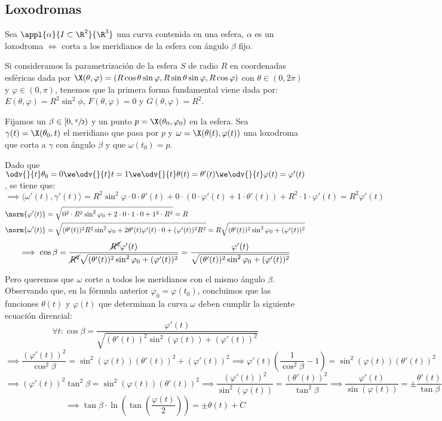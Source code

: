 \subsection{Loxodromas}

\begin{defn}[Loxodroma]
	Sea $\appl{\alpha}{I\subset\R^2}{\R^3}$ una curva contenida en una esfera, $\alpha$ es un loxodroma $\iff$ corta a los meridianos de la esfera con ángulo $\beta$ fijo.
\end{defn}

Si consideramos la parametrización de la esfera $S$ de radio $R$ en coordenadas esféricas dada por $\X(\theta, \varphi) = (R\cos\theta \sin\varphi, R\sin\theta \sin\varphi, R\cos\varphi)$ con $\theta \in (0, 2\pi)$ y $\varphi \in (0, \pi)$, tenemos que la primera forma fundamental viene dada por: $E(\theta, \varphi)=R^2\sin^2\phi$, $F(\theta, \varphi)=0$ y $G(\theta, \varphi)=R^2$.

Fijamos un $\beta \in [0, \sfrac{\pi}{2})$ y un punto $p = \X(\theta_0, \varphi_0)$ en la esfera. Sea $\gamma(t) = \X(\theta_0, t)$ el meridiano que pasa por $p$ y $\omega = \X(\theta(t), \varphi(t))$ una loxodroma que corta a $\gamma$ con ángulo $\beta$ y que $\omega(t_0) = p$.

Dado que $\odv{}{t} \theta_0 = 0 \we \odv{}{t} t = 1 \we \odv{}{t} \theta(t) = \theta'(t) \we \odv{}{t} \varphi(t) = \varphi'(t)$, se tiene que:
\[\implies \langle \omega'(t), \gamma'(t) \rangle =	R^2\sin^2\varphi \cdot 0 \cdot \theta'(t) + 0 \cdot (0\cdot \varphi'(t) + 1\cdot \theta'(t)) + R^2\cdot 1\cdot \varphi'(t) = R^2\varphi'(t)\]
\[\begin{aligned}
		\norm{\varphi'(t)} & = \sqrt{0^2\cdot R^2\sin^2\varphi_0 + 2 \cdot 0 \cdot 1 \cdot 0 + 1^2\cdot R^2} = R                                                                          \\
		\norm{\omega'(t)}  & = \sqrt{(\theta'(t))^2 R^2 \sin^2\varphi_0 + 2\theta'(t)\varphi'(t) \cdot 0 + (\varphi'(t))^2 R^2} = R\sqrt{(\theta'(t))^2\sin^2\varphi_0 + (\varphi'(t))^2}
	\end{aligned}\]
\[\implies \cos\beta = \frac{\cancel{R^2}\varphi'(t)}{\cancel{R^2}\sqrt{(\theta'(t))^2\sin^2\varphi_0 + (\varphi'(t))^2}} = \frac{\varphi'(t)}{\sqrt{(\theta'(t))^2\sin^2\varphi_0 + (\varphi'(t))^2}}\]

Pero queremos que $\omega$ corte a todos los meridianos con el mismo ángulo $\beta$. Observando que, en la fórmula anterior $\varphi_0 = \varphi(t_0)$, concluimos que las funciones $\theta(t)$ y $\varphi(t)$ que determinan la curva $\omega$ deben cumplir la siguiente ecuación direncial:
\[\forall t : \boxed{\cos\beta = \frac{\varphi'(t)}{\sqrt{(\theta'(t))^2\sin^2(\varphi(t)) + (\varphi'(t))^2}}}\]
\[\implies \frac{(\varphi'(t))^2}{\cos^2\beta} = \sin^2(\varphi(t))(\theta'(t))^2 + (\varphi'(t))^2 \implies \varphi'(t)\left(\frac{1}{\cos^2\beta} - 1\right) = \sin^2(\varphi(t))(\theta'(t))^2\]
\[\implies (\varphi'(t))^2\tan^2\beta = \sin^2 (\varphi(t))(\theta'(t))^2 \implies \frac{(\varphi'(t))^2}{\sin^2(\varphi(t))} = \frac{(\theta'(t))^2}{\tan^2\beta}\implies \frac{\varphi'(t)}{\sin(\varphi(t))} = \pm\frac{\theta'(t)}{\tan\beta}\]
\[\implies \boxed{\tan\beta \cdot \ln\left(\tan\left(\frac{\varphi(t)}{2}\right)\right) = \pm \theta(t) + C}\]

